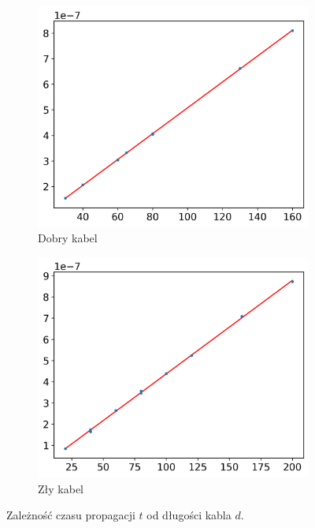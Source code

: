 \documentclass[12pt]{article}
\begin{document}
\begin{figure}[H]
  \centering
  \begin{subfigure}{0.45\textwidth}
    \includegraphics[width=\linewidth]{good_cable_distance}
    \caption{Dobry kabel}
    \label{fig:good_distance}
  \end{subfigure}\hfill
  \begin{subfigure}{0.45\textwidth}
    \includegraphics[width=\linewidth]{bad_cable_distance}
    \caption{Zły kabel}
    \label{fig:bad_distance}
  \end{subfigure}
  \caption{Zależność czasu propagacji $t$ od długości kabla $d$.}
  \label{fig:distance}
\end{figure}
\end{document}

